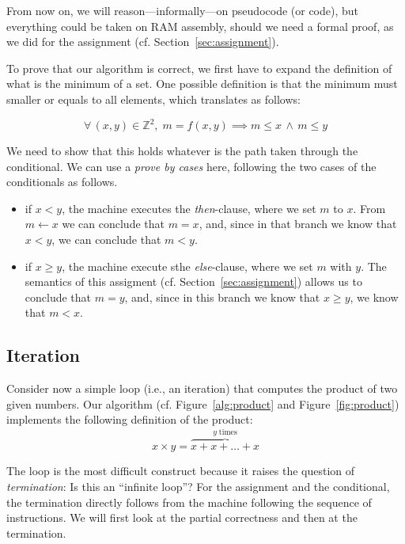 \documentclass{aldast}
\begin{document}
From now on, we will reason---informally---on pseudocode (or code),
but everything could be taken on RAM assembly, should we need a formal
proof, as we did for the assignment (cf. Section~\ref{sec:assignment}).

To prove that our algorithm is correct, we first have to expand the
definition of what is the minimum of a set. One possible definition is
that the minimum must smaller or equals to all elements, which
translates as follows:

\begin{equation}
 \forall \, (x, y) \in \mathbb{Z}^2, \; m = f(x,y) \implies m \leq x \, \land \, m \leq y
\end{equation}

We need to show that this holds
whatever is the path taken through the conditional. We can use a
\emph{prove by cases} here, following the two cases of the
conditionals as follows.

\begin{itemize}
\item if $x<y$, the machine executes the \emph{then}-clause, where we
  set $m$ to $x$. From $m \gets x$ we can conclude that $m = x$, and,
  since in that branch we know that $x<y$, we can conclude that $m<y$.
\item if $x \geq y$, the machine execute sthe \emph{else}-clause,
  where we set $m$ with $y$. The semantics of this assigment
  (cf. Section~\ref{sec:assignment}) allows us to conclude that
  $m = y$, and, since in this branch we know that $x \geq y$, we know
  that $m < x$.
\end{itemize}


\subsection{Iteration}
Consider now a simple loop (i.e., an iteration) that computes the
product of two given numbers. Our algorithm (cf. Figure~\ref{alg:product} and Figure~\ref{fig:product}) implements the
following definition of the product:
\begin{equation}
  x \times y = \overbrace{x+x+\ldots+x}^{y\;\mathrm{times}}
\end{equation}

The loop is the most difficult construct because it raises the
question of \emph{termination}: Is this an ``infinite loop''? For the
assignment and the conditional, the termination directly follows from
the machine following the sequence of instructions. We will first look
at the partial correctness and then at the termination.
\end{document}
